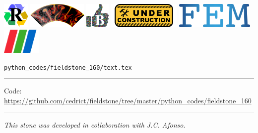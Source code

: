\noindent
\includegraphics[height=1.25cm]{images/pictograms/replication}
\includegraphics[height=1.25cm]{images/pictograms/aspect_logo}
\includegraphics[height=1.25cm]{images/pictograms/benchmark}
\includegraphics[height=1.25cm]{images/pictograms/under_construction}
\includegraphics[height=1.25cm]{images/pictograms/FEM}
\includegraphics[height=1.25cm]{images/pictograms/paraview}


\begin{flushright} {\tiny {\color{gray} \tt python\_codes/fieldstone\_160/text.tex}} \end{flushright}

%

\par\noindent\rule{\textwidth}{0.4pt}

\begin{center}
\inpython
{\small Code: \url{https://github.com/cedrict/fieldstone/tree/master/python_codes/fieldstone_160}}
\end{center}

\par\noindent\rule{\textwidth}{0.4pt}

{\sl This stone was developed in collaboration with J.C. Afonso}. 

